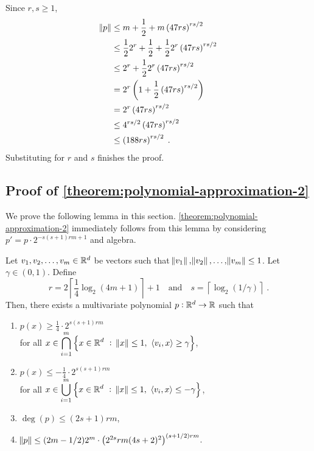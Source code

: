 Since $r,s \ge 1$,
\begin{align*}
\norm{p}
& \le m + \frac{1}{2} + m \left(47 rs \right)^{rs/2} \\
& \le \frac{1}{2} 2^r + \frac{1}{2} + \frac{1}{2} 2^r \left(47 rs \right)^{rs/2} \\
& \le 2^r + \frac{1}{2} 2^r \left(47 rs \right)^{rs/2} \\
& = 2^r \left(1 + \frac{1}{2} \left(47 rs \right)^{rs/2} \right) \\
& = 2^r \left(47 rs \right)^{rs/2} \\
& \le 4^{rs/2} \left(47 rs \right)^{rs/2} \\
& \le \left(188 rs \right)^{rs/2} \; .
\end{align*}
Substituting for $r$ and $s$ finishes the proof.


\subsection{Proof of \autoref{theorem:polynomial-approximation-2}}
\label{section:proof-of-polynomial-approximation-2}

We prove the following lemma in this section.
\autoref{theorem:polynomial-approximation-2} immediately
follows from this lemma by considering $p' = p \cdot 2^{-s(s+1)rm+1}$
and algebra.

\begin{lemma}
\label{lemma:polynomial-approximation-2}
Let $v_1, v_2, \dots, v_m \in \mathbb{R}^d$ be vectors such that $\norm{v_1},
\norm{v_2}, \dots, \norm{v_m} \le 1$. Let $\gamma \in (0,1)$.
Define
$$
r = 2 \left\lceil \frac{1}{4} \log_2(4m + 1) \right\rceil + 1 \quad \text{and} \quad s = \left \lceil \log_2(1/\gamma) \right \rceil \; .
$$
Then, there exists a multivariate polynomial $p:\mathbb{R}^d \to \mathbb{R}$ such that
\begin{enumerate}
\item $\displaystyle p(x) \ge \frac{1}{4} \cdot 2^{s(s+1)rm}$ \\
for all $\displaystyle x \in \bigcap_{i=1}^m \left\{ x \in \mathbb{R}^d ~:~ \norm{x} \le 1, \ \left\langle v_i, x \right\rangle \ge \gamma \right\}$,

\item $\displaystyle p(x) \le - \frac{1}{4} \cdot 2^{s(s+1)rm}$ \\
for all $\displaystyle x \in \bigcup_{i=1}^m \left\{ x \in \mathbb{R}^d ~:~ \norm{x} \le 1, \ \left\langle v_i, x \right\rangle \le - \gamma \right\}$,

\item $\deg(p) \le (2s+1) rm$,
\item $\norm{p} \le (2m-1/2) 2^m \cdot \left(2^{2s} rm (4s+2)^2 \right)^{(s+1/2)rm}$.
\end{enumerate}
\end{lemma}

